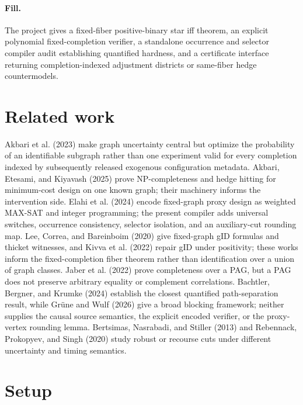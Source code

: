 \documentclass{article}
\begin{document}
\paragraph{Fill.} The project gives a fixed-fiber positive-binary star iff theorem, an explicit polynomial fixed-completion verifier, a standalone occurrence and selector compiler audit establishing quantified hardness, and a certificate interface returning completion-indexed adjustment districts or same-fiber hedge countermodels.

\section{Related work}

Akbari et al. (2023) make graph uncertainty central but optimize the probability of an identifiable subgraph rather than one experiment valid for every completion indexed by subsequently released exogenous configuration metadata. Akbari, Etesami, and Kiyavash (2025) prove NP-completeness and hedge hitting for minimum-cost design on one known graph; their machinery informs the intervention side. Elahi et al. (2024) encode fixed-graph proxy design as weighted MAX-SAT and integer programming; the present compiler adds universal switches, occurrence consistency, selector isolation, and an auxiliary-cut rounding map. Lee, Correa, and Bareinboim (2020) give fixed-graph gID formulas and thicket witnesses, and Kivva et al. (2022) repair gID under positivity; these works inform the fixed-completion fiber theorem rather than identification over a union of graph classes. Jaber et al. (2022) prove completeness over a PAG, but a PAG does not preserve arbitrary equality or complement correlations. Bachtler, Bergner, and Krumke (2024) establish the closest quantified path-separation result, while Grüne and Wulf (2026) give a broad blocking framework; neither supplies the causal source semantics, the explicit encoded verifier, or the proxy-vertex rounding lemma. Bertsimas, Nasrabadi, and Stiller (2013) and Rebennack, Prokopyev, and Singh (2020) study robust or recourse cuts under different uncertainty and timing semantics.

\section{Setup}
\end{document}
